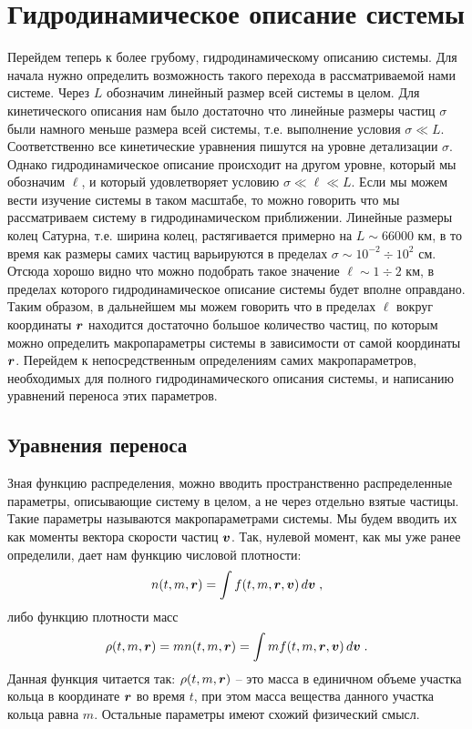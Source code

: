 \chapter{Гидродинамическое описание системы}
\label{cha:design}

Перейдем теперь к более грубому, гидродинамическому описанию системы. Для начала нужно определить возможность такого перехода
в рассматриваемой нами системе. Через $L$ обозначим линейный размер всей системы в целом. Для кинетического описания нам было достаточно
что линейные размеры частиц $\sigma$ были намного меньше размера всей системы, т.е. выполнение условия $\sigma\ll L$. Соответственно
все кинетические уравнения пишутся на уровне детализации $\sigma$. Однако гидродинамическое описание происходит на другом уровне,
который мы обозначим $\ell$, и который удовлетворяет условию $\sigma\ll\ell\ll L$. Если мы можем вести изучение системы в таком масштабе,
то можно говорить что мы рассматриваем систему в гидродинамическом приближении. Линейные размеры колец Сатурна, т.е. ширина колец,
растягивается примерно на $L\sim 66 000$ км, в то время как размеры самих частиц варьируются в пределах $\sigma\sim 10^{-2}\div 10^2$ см.
Отсюда хорошо видно что можно подобрать такое значение $\ell\sim 1\div 2$ км, в пределах которого гидродинамическое описание системы
будет вполне оправдано. Таким образом, в дальнейшем мы можем говорить что в пределах $\ell$ вокруг координаты $\bm{r}$ находится достаточно большое
количество частиц, по которым можно определить макропараметры системы в зависимости от самой координаты $\bm{r}$. Перейдем к непосредственным 
определениям самих макропараметров, необходимых для полного гидродинамического описания системы, и написанию уравнений переноса
этих параметров.

\section{Уравнения переноса}

Зная функцию распределения, можно вводить пространственно распределенные параметры, описывающие систему в целом, а не через отдельно
взятые частицы. Такие параметры называются макропараметрами системы. Мы будем вводить их как моменты вектора скорости частиц $\bm{v}$. Так,
нулевой момент, как мы уже ранее определили, дает нам функцию числовой плотности:
\begin{equation}
  n(t,m,\bm{r}) = \int f(t,m,\bm{r},\bm{v})\,d\bm{v}\;,
\end{equation}
либо функцию плотности масс
\begin{equation}\label{eq:mass_density}
  \rho(t,m,\bm{r}) = mn(t,m,\bm{r}) = \int mf(t,m,\bm{r},\bm{v})\,d\bm{v}\;.
\end{equation}
Данная функция читается так: $\rho(t,m,\bm{r})$ -- это масса в единичном объеме участка кольца в координате $\bm{r}$ во время $t$, при этом 
масса вещества данного участка кольца равна $m$. Остальные параметры имеют схожий физический смысл.

